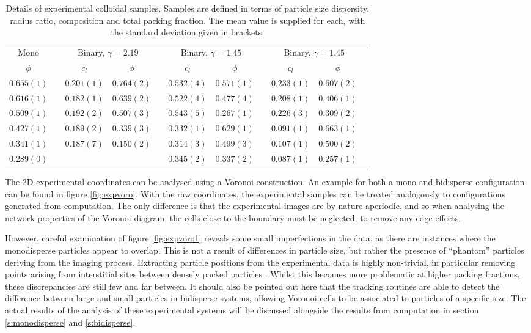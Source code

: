 \begin{table}
\centering
\caption{Details of experimental colloidal samples. Samples are defined in terms of particle size dispersity, radius ratio, composition and total packing fraction. The mean value is supplied for each, with the standard deviation given in brackets.}
\label{tab:expcolloid}
\begin{tabular}{@{}ccccccccccc@{}}
\toprule
\multicolumn{1}{c}{Mono} & \phantom{x} & \multicolumn{2}{c}{Binary, $\gamma=2.19$} & \phantom{x} & \multicolumn{2}{c}{Binary, $\gamma=1.45$} & \phantom{x} & \multicolumn{2}{c}{Binary, $\gamma=1.45$}\\ 
\cmidrule{1-1} \cmidrule{3-4} \cmidrule{6-7} \cmidrule{9-10}
$\phi$ & & $c_l$ & $\phi$ &  & $c_l$ & $\phi$ & & $c_l$ & $\phi$  \\ 
\midrule
$0.655(1)$&&$0.201(1)$&$0.764(2)$&&$0.532(4)$&$0.571(1)$&&$0.233(1)$&$0.607(2)$\\
$0.616(1)$&&$0.182(1)$&$0.639(2)$&&$0.522(4)$&$0.477(4)$&&$0.208(1)$&$0.406(1)$\\
$0.509(1)$&&$0.192(2)$&$0.507(3)$&&$0.543(5)$&$0.267(1)$&&$0.226(3)$&$0.309(2)$\\
$0.427(1)$&&$0.189(2)$&$0.339(3)$&&$0.332(1)$&$0.629(1)$&&$0.091(1)$&$0.663(1)$\\
$0.341(1)$&&$0.187(7)$&$0.150(2)$&&$0.314(3)$&$0.499(3)$&&$0.107(1)$&$0.500(2)$\\
$0.289(0)$&& &&&$0.345(2)$&$0.337(2)$&&$0.087(1)$&$0.257(1)$\\
\bottomrule
\end{tabular}
\end{table}

The 2D experimental coordinates can be analysed using a Voronoi construction. An example for both a mono and bidisperse configuration can be found in figure \ref{fig:expvoro}.
With the raw coordinates, the experimental samples can be treated analogously to configurations generated from computation.
The only difference is that the experimental images are by nature aperiodic, and so when analysing the network properties of the Voronoi diagram, the cells close to the boundary must be neglected, to remove any edge effects. 

However, careful examination of figure \ref{fig:expvoro1} reveals some small imperfections in the data, as there are instances where the monodisperse particles appear to overlap.
This is not a result of differences in particle size, but rather the presence of ``phantom'' particles deriving from the imaging process.
Extracting particle positions from the experimental data is highly non\--trivial, in particular removing points arising from interstitial sites between densely packed particles \cite{alice2015a}.
Whilst this becomes more problematic at higher packing fractions, these discrepancies are still few and far between.
It should also be pointed out here that the tracking routines are able to detect the difference between large and small particles in bidisperse systems, allowing Voronoi cells to be associated to particles of a specific size.
The actual results of the analysis of these experimental systems will be discussed alongside the results from computation in section \ref{s:monodisperse} and \ref{s:bidisperse}.

